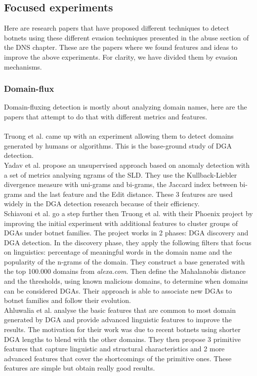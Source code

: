 \subsection{Focused experiments}
Here are research papers that have proposed different techniques to detect botnets using these different evasion techniques presented in the abuse section of the DNS chapter. These are the papers where we found features and ideas to improve the above experiments. For clarity, we have divided them by evasion mechanisms.
\subsubsection{Domain-flux}
Domain-fluxing detection is mostly about analyzing domain names, here are the papers that attempt to do that with different metrics and features.\\
\\
Truong et al. \cite{dns-traffic} came up with an experiment allowing them to detect domains generated by humans or algorithms. This is the base-ground study of DGA detection.\\

Yadav et al. \cite{dga2} propose an unsupervised approach based on anomaly detection with a set of metrics analysing ngrams of the SLD. They use the Kullback-Liebler divergence measure with uni-grams and bi-grams, the Jaccard index between bi-grams and the last feature and the Edit distance. These 3 features are used widely in the DGA detection research because of their efficiency.\\

Schiavoni et al. \cite{phoenix} go a step further then Truong et al. with their Phoenix project by improving the initial experiment with additional features to cluster groups of DGAs under botnet families. The project works in 2 phases: DGA discovery and DGA detection. In the discovery phase, they apply the following filters that focus on linguistics: percentage of meaningful words in the domain name and the popularity of the n-grams of the domain. They construct a base generated with the top 100.000 domains from \textit{alexa.com}. Then define the Mahalanobis distance and the thresholds, using known malicious domains,  to determine when domains can be considered DGAs. Their approach is able to associate new DGAs to botnet families and follow their evolution.\\

Ahluwalia et al. \cite{dga} analyse the basic features that are common to most domain generated by DGA and provide advanced linguistic features to improve the results. The motivation for their work was due to recent botnets using shorter DGA lengths to blend with the other domains. They then propose 3 primitive features that capture linguistic and structural characteristics and 2 more advanced features that cover the shortcomings of the primitive ones. These features are simple but obtain really good results.\\

